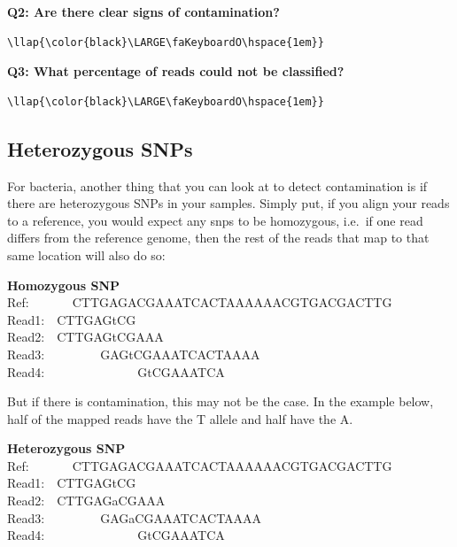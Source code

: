 \documentclass[11pt]{article}
\begin{document}
    \textbf{Q2: Are there clear signs of contamination?}

\begin{terminalinput}
\begin{Verbatim}[commandchars=\\\{\}]
\llap{\color{black}\LARGE\faKeyboardO\hspace{1em}}
\end{Verbatim}
\end{terminalinput}

    \textbf{Q3: What percentage of reads could not be classified?}

\begin{terminalinput}
\begin{Verbatim}[commandchars=\\\{\}]
\llap{\color{black}\LARGE\faKeyboardO\hspace{1em}}
\end{Verbatim}
\end{terminalinput}

    \hypertarget{heterozygous-snps}{%
\subsection{Heterozygous SNPs}\label{heterozygous-snps}}

For bacteria, another thing that you can look at to detect contamination
is if there are heterozygous SNPs in your samples. Simply put, if you
align your reads to a reference, you would expect any snps to be
homozygous, i.e.~if one read differs from the reference genome, then the
rest of the reads that map to that same location will also do so:

\textbf{Homozygous SNP}\\
Ref:~~~~~~~CTTGAGACGAAATCACTAAAAAACGTGACGACTTG\\
Read1:~~CTTGAGtCG\\
Read2:~~CTTGAGtCGAAA\\
Read3:~~~~~~~~~GAGtCGAAATCACTAAAA\\
Read4:~~~~~~~~~~~~~~~GtCGAAATCA

But if there is contamination, this may not be the case. In the example
below, half of the mapped reads have the T allele and half have the A.

\textbf{Heterozygous SNP}\\
Ref:~~~~~~~CTTGAGACGAAATCACTAAAAAACGTGACGACTTG\\
Read1:~~CTTGAGtCG\\
Read2:~~CTTGAGaCGAAA\\
Read3:~~~~~~~~~GAGaCGAAATCACTAAAA\\
Read4:~~~~~~~~~~~~~~~GtCGAAATCA
\end{document}
